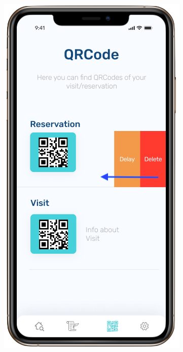 \begin{figure}[H]
\begin{center}
{            \includegraphics[scale=0.35]{images/mockup/qr5.png}
        }%
\end{center}
\end{figure}
